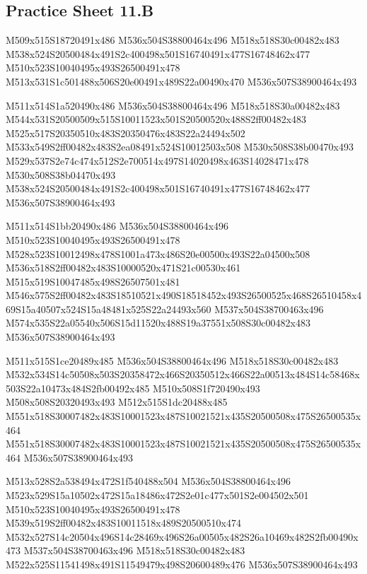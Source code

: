 \documentclass{article}
\begin{document}
\subsection{Practice Sheet 11.B}

\begin{multicols}{5}
\begin{center}

M509x515S18720491x486 %
M536x504S38800464x496 %
M518x518S30c00482x483 %
M538x524S20500484x491S2c400498x501S16740491x477S16748462x477 %
M510x523S10040495x493S26500491x478 %
M513x531S1c501488x506S20e00491x489S22a00490x470 %
M536x507S38900464x493 %
\vfil
\columnbreak

M511x514S1a520490x486 %
M536x504S38800464x496 %
M518x518S30a00482x483 %
M544x531S20500509x515S10011523x501S20500520x488S2ff00482x483 %
M525x517S20350510x483S20350476x483S22a24494x502 %
M533x549S2ff00482x483S2ea08491x524S10012503x508 %
M530x508S38b00470x493 %
M529x537S2e74c474x512S2e700514x497S14020498x463S14028471x478 %
M530x508S38b04470x493 %
M538x524S20500484x491S2c400498x501S16740491x477S16748462x477 %
M536x507S38900464x493 %
\vfil
\columnbreak

M511x514S1bb20490x486 %
M536x504S38800464x496 %
M510x523S10040495x493S26500491x478 %
M528x523S10012498x478S1001a473x486S20e00500x493S22a04500x508 %
M536x518S2ff00482x483S10000520x471S21c00530x461 %
M515x519S10047485x498S26507501x481 %
M546x575S2ff00482x483S18510521x490S18518452x493S26500525x468S26510458x469S15a40507x524S15a48481x525S22a24493x560 %
M537x504S38700463x496 %
M574x535S22a05540x506S15d11520x488S19a37551x508S30c00482x483 %
M536x507S38900464x493 %
\vfil
\columnbreak

M511x515S1ce20489x485 %
M536x504S38800464x496 %
M518x518S30c00482x483 %
M532x534S14c50508x503S20358472x466S20350512x466S22a00513x484S14c58468x503S22a10473x484S2fb00492x485 %
M510x508S1f720490x493 %
M508x508S20320493x493 %
M512x515S1dc20488x485 %
M551x518S30007482x483S10001523x487S10021521x435S20500508x475S26500535x464 %
M551x518S30007482x483S10001523x487S10021521x435S20500508x475S26500535x464 %
M536x507S38900464x493 %
\vfil
\columnbreak

M513x528S2a538494x472S1f540488x504 %
M536x504S38800464x496 %
M523x529S15a10502x472S15a18486x472S2e01c477x501S2e004502x501 %
M510x523S10040495x493S26500491x478 %
M539x519S2ff00482x483S10011518x489S20500510x474 %
M532x527S14c20504x496S14c28469x496S26a00505x482S26a10469x482S2fb00490x473 %
M537x504S38700463x496 %
M518x518S30c00482x483 %
M522x525S11541498x491S11549479x498S20600489x476 %
M536x507S38900464x493 %
\vfil

\end{center}
\end{multicols}
\end{document}
